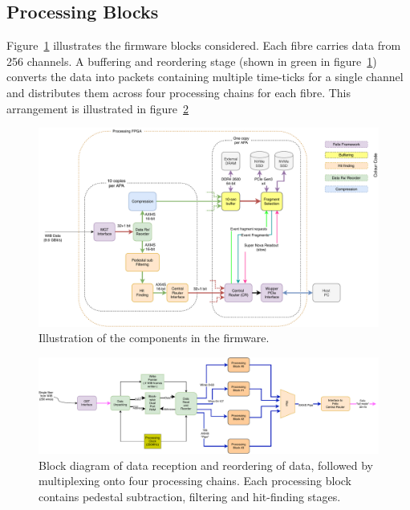 \documentclass{article}
\begin{document}
\subsection{Processing Blocks}

Figure~\ref{fig:daq-firmware-block-diagram}  illustrates the firmware blocks considered. Each \single {} fibre carries data from 256 channels. A buffering and reordering stage (shown in green in figure~\ref{fig:daq-firmware-block-diagram}) converts the data into packets containing multiple time-ticks for a single channel and distributes them across four processing chains for each  fibre. This arrangement is illustrated in figure~\ref{fig:wib-data-rx-mux}

\begin{figure}[H]
  \includegraphics[width=1.1\textwidth]{dune_daq_felix_hitfinding_blocks_02.pdf}
  \caption{Illustration of the components in the  firmware. }
  \label{fig:daq-firmware-block-diagram}
\end{figure}

\begin{figure}[H]
  \includegraphics[width=1.1\textwidth]{DUNE_firmware_single_wib_fibre_block_diagram_01.pdf}
  \caption{Block diagram of data reception and reordering of  data, followed by multiplexing onto four processing chains. Each processing block contains pedestal subtraction, filtering and hit-finding stages.}
  \label{fig:wib-data-rx-mux}
\end{figure}
\end{document}
